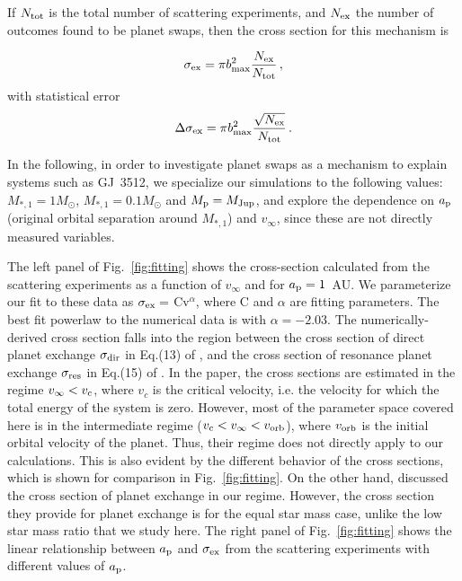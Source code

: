 \documentclass[twocolumn]{aastex62}
\begin{document}
If $N_{\rm tot}$ is the total number of scattering experiments, and $N_{\rm ex}$ the number of outcomes found to be planet swaps, then the cross section for this mechanism is \citep[e.g.][]{hut83}

\begin{equation}
\sigma_{\rm ex} = \pi b_{\rm max}^2\frac{N_{\rm ex}}{N_{\rm tot}}\,,
\end{equation}
with statistical error
\begin{equation}
\Delta\sigma_{\rm ex} = \pi b_{\rm max}^2\frac{\sqrt{N_{\rm ex}}}{N_{\rm tot}}\,.
\end{equation}


In the following, in order to investigate planet swaps as a mechanism to explain systems 
such as GJ~3512, we specialize 
our simulations to the following values:  $M_{*,1}=1M_\odot$, $M_{*,1}=0.1M_\odot$ and $M_{\rm p}=M_{\rm Jup}$, and explore the dependence on $a_{\rm p}$ (original orbital separation around $M_{*,1}$) and $v_\infty$, since these are not directly measured variables.

The left panel of Fig.~\ref{fig:fitting} shows the cross-section calculated from the scattering experiments as a function of $v_\infty$ and for $a_{\rm p}=1$~AU.  We parameterize our fit to these data as $\sigma_{\rm ex} =$ Cv$^{\alpha}$, where C and $\alpha$ are fitting parameters.  The best fit powerlaw to the numerical data is with $\alpha=-2.03$. The numerically-derived cross section falls into the region between the cross section of direct planet exchange $\sigma_{\rm dir}$ in Eq.(13) of \citet{Heggie96}, and the cross section of resonance planet exchange $\sigma_{\rm res}$ in Eq.(15) of \citet{Heggie96}. In the \citet{Heggie96} paper, the cross sections are estimated in the regime $v_\infty < v_{\rm c}$, where $v_c$ is the critical velocity, i.e. the velocity for which the total energy of the system is zero. However, most of the parameter space covered here is in the intermediate regime ($v_{\rm c} < v_\infty < v_{\rm orb}$), where $v_{\rm orb}$ is the initial orbital velocity of the planet. Thus,  their regime does not directly apply to our calculations. This is also evident by the different behavior of the cross sections, which is shown for comparison in Fig.~\ref{fig:fitting}. On the other hand, \citet{Fregeau2006} discussed the cross section of planet exchange in our regime. However, the cross section they provide for planet exchange is for the equal star mass case, unlike  the low star mass ratio that we study here. The right panel of Fig.~\ref{fig:fitting} shows the linear relationship between $a_{\rm p}$ and $\sigma_{\rm ex}$ from the scattering experiments with different values of $a_{\rm p}$. 
\end{document}

